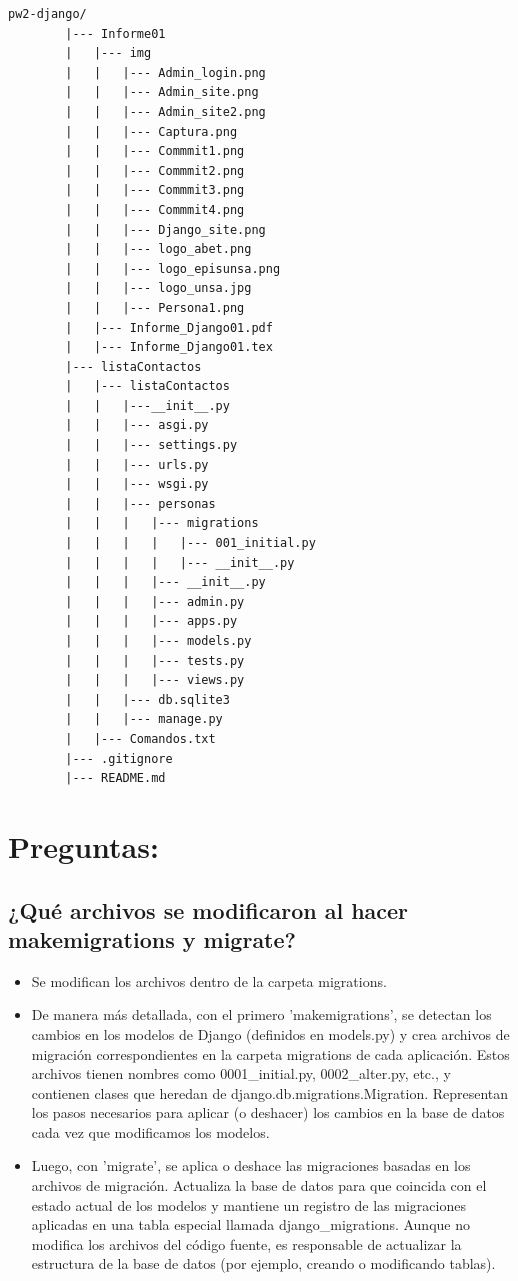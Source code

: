 \documentclass{article}
\begin{document}
        \begin{lstlisting}[style=ascii-tree]
        pw2-django/
        |--- Informe01
        |   |--- img
        |   |   |--- Admin_login.png
        |   |   |--- Admin_site.png
        |   |   |--- Admin_site2.png
        |   |   |--- Captura.png
        |   |   |--- Commmit1.png
        |   |   |--- Commmit2.png
        |   |   |--- Commmit3.png
        |   |   |--- Commmit4.png
        |   |   |--- Django_site.png
        |   |   |--- logo_abet.png
        |   |   |--- logo_episunsa.png
        |   |   |--- logo_unsa.jpg
        |   |   |--- Persona1.png
        |   |--- Informe_Django01.pdf    
        |   |--- Informe_Django01.tex
        |--- listaContactos
        |   |--- listaContactos
        |   |   |---__init__.py
        |   |   |--- asgi.py
        |   |   |--- settings.py
        |   |   |--- urls.py
        |   |   |--- wsgi.py
        |   |   |--- personas
        |   |   |   |--- migrations
        |   |   |   |   |--- 001_initial.py
        |   |   |   |   |--- __init__.py
        |   |   |   |--- __init__.py
        |   |   |   |--- admin.py
        |   |   |   |--- apps.py
        |   |   |   |--- models.py
        |   |   |   |--- tests.py
        |   |   |   |--- views.py
        |   |   |--- db.sqlite3
        |   |   |--- manage.py
        |   |--- Comandos.txt
        |--- .gitignore
        |--- README.md
        \end{lstlisting}
    \clearpage
        
    \section{Preguntas:}
        \subsection{¿Qué archivos se modificaron al hacer makemigrations y migrate?}
        \begin{itemize}
            \item Se modifican los archivos dentro de la carpeta migrations.
            \item De manera más detallada, con el primero 'makemigrations', se detectan los cambios en los modelos de Django (definidos en models.py) y crea archivos de migración correspondientes en la carpeta migrations de cada aplicación. Estos archivos tienen nombres como 0001\_initial.py, 0002\_alter.py, etc., y contienen clases que heredan de django.db.migrations.Migration. Representan los pasos necesarios para aplicar (o deshacer) los cambios en la base de datos cada vez que modificamos los modelos.
            \item Luego, con 'migrate', se aplica o deshace las migraciones basadas en los archivos de migración. Actualiza la base de datos para que coincida con el estado actual de los modelos y mantiene un registro de las migraciones aplicadas en una tabla especial llamada django\_migrations. Aunque no modifica los archivos del código fuente, es responsable de actualizar la estructura de la base de datos (por ejemplo, creando o modificando tablas). 
        \end{itemize}
\end{document}
